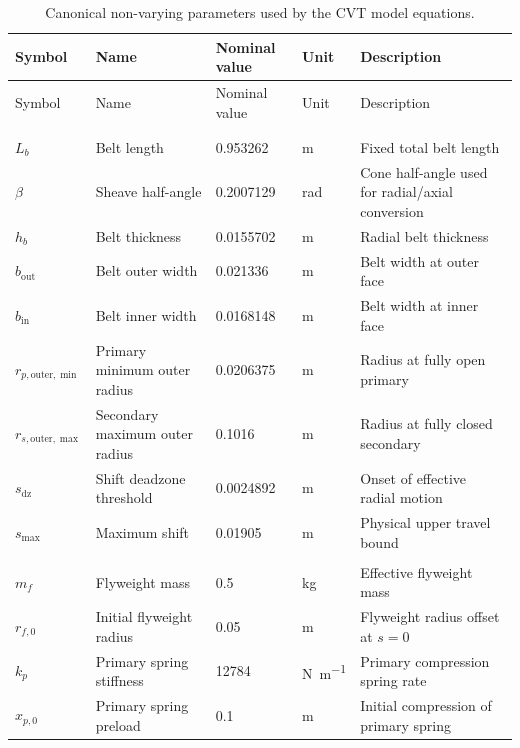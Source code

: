 \documentclass[11pt]{article}
\numberwithin{equation}{section}
\begin{document}
\begin{center}
\small
\setlength{\LTleft}{0pt}
\setlength{\LTright}{0pt}
\begin{longtable}{@{}p{}p{}p{}p{}p{}@{}}
\toprule
Symbol & Name & Nominal value & Unit & Description \\ \midrule
\endfirsthead
\toprule
Symbol & Name & Nominal value & Unit & Description \\ \midrule
\endhead
\bottomrule
\endfoot
\bottomrule
\caption{Canonical non-varying parameters used by the CVT model equations.}
\label{tab:constants}\\
\endlastfoot
\multicolumn{5}{@{}l}{\textbf{Geometry and belt}} \\
$L_b$ & Belt length & 0.953262 & \si{\meter} & Fixed total belt length \\
$\beta$ & Sheave half-angle & 0.2007129 & \si{\radian} & Cone half-angle used for radial/axial conversion \\
$h_b$ & Belt thickness & 0.0155702 & \si{\meter} & Radial belt thickness \\
$b_{\mathrm{out}}$ & Belt outer width & 0.021336 & \si{\meter} & Belt width at outer face \\
$b_{\mathrm{in}}$ & Belt inner width & 0.0168148 & \si{\meter} & Belt width at inner face \\
$r_{p,\text{outer},\min}$ & Primary minimum outer radius & 0.0206375 & \si{\meter} & Radius at fully open primary \\
$r_{s,\text{outer},\max}$ & Secondary maximum outer radius & 0.1016 & \si{\meter} & Radius at fully closed secondary \\
$s_{\mathrm{dz}}$ & Shift deadzone threshold & 0.0024892 & \si{\meter} & Onset of effective radial motion \\
$s_{\max}$ & Maximum shift & 0.01905 & \si{\meter} & Physical upper travel bound \\
\addlinespace
\multicolumn{5}{@{}l}{\textbf{Primary/secondary actuation}} \\
$m_f$ & Flyweight mass & 0.5 & \si{\kilogram} & Effective flyweight mass \\
$r_{f,0}$ & Initial flyweight radius & 0.05 & \si{\meter} & Flyweight radius offset at $s=0$ \\
$k_p$ & Primary spring stiffness & 12784 & \si{\newton\per\meter} & Primary compression spring rate \\
$x_{p,0}$ & Primary spring preload & 0.1 & \si{\meter} & Initial compression of primary spring \\

\end{longtable}
\end{center}
\end{document}
